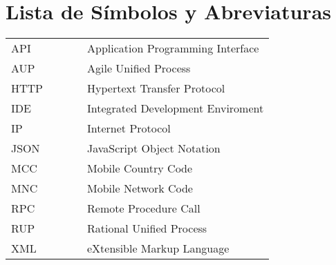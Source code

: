 
\chapter*{{\large Lista de Símbolos y Abreviaturas}}

\renewcommand{\thepage}{\Roman{page}}

%

%
\vspace{5mm}


\begin{onehalfspace}
\begin{center}
\begin{tabular}{llll>{\raggedright}p{11cm}}
API &  &  &  & Application Programming Interface\tabularnewline
AUP &  &  &  & Agile Unified Process\tabularnewline
HTTP &  &  &  & Hypertext Transfer Protocol\tabularnewline
IDE &  &  &  & Integrated Development Enviroment\tabularnewline
IP &  &  &  & Internet Protocol\tabularnewline
JSON &  &  &  & JavaScript Object Notation\tabularnewline
MCC &  &  &  & Mobile Country Code\tabularnewline
MNC &  &  &  & Mobile Network Code\tabularnewline
RPC &  &  &  & Remote Procedure Call\tabularnewline
RUP &  &  &  & Rational Unified Process\tabularnewline
XML &  &  &  & eXtensible Markup Language\tabularnewline
\end{tabular}
\par\end{center}
\end{onehalfspace}

\pagebreak{}
